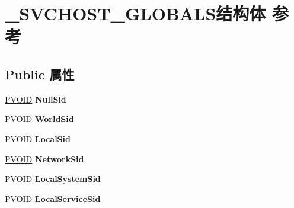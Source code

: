 \hypertarget{struct___s_v_c_h_o_s_t___g_l_o_b_a_l_s}{}\section{\+\_\+\+S\+V\+C\+H\+O\+S\+T\+\_\+\+G\+L\+O\+B\+A\+L\+S结构体 参考}
\label{struct___s_v_c_h_o_s_t___g_l_o_b_a_l_s}
\subsection*{Public 属性}
\begin{DoxyCompactItemize}
\item 
\mbox{\label{struct___s_v_c_h_o_s_t___g_l_o_b_a_l_s_aa0433845f48ce03dc8db1f6a7aff663c}} 
\hyperlink{interfacevoid}{P\+V\+O\+ID} {\bfseries Null\+Sid}
\item 
\mbox{\label{struct___s_v_c_h_o_s_t___g_l_o_b_a_l_s_aa13aeac5885f976b3e39a9c8c1068844}} 
\hyperlink{interfacevoid}{P\+V\+O\+ID} {\bfseries World\+Sid}
\item 
\mbox{\label{struct___s_v_c_h_o_s_t___g_l_o_b_a_l_s_a91bd88e223a397de2829b67fd3712690}} 
\hyperlink{interfacevoid}{P\+V\+O\+ID} {\bfseries Local\+Sid}
\item 
\mbox{\label{struct___s_v_c_h_o_s_t___g_l_o_b_a_l_s_a564578c4a7e471e315ce141f4589a567}} 
\hyperlink{interfacevoid}{P\+V\+O\+ID} {\bfseries Network\+Sid}
\item 
\mbox{\label{struct___s_v_c_h_o_s_t___g_l_o_b_a_l_s_a6bd38664a2cb8d6b0abaabf14c57d56b}} 
\hyperlink{interfacevoid}{P\+V\+O\+ID} {\bfseries Local\+System\+Sid}
\item 
\mbox{\label{struct___s_v_c_h_o_s_t___g_l_o_b_a_l_s_aed55e2fb7560860435822869ecfa3b5b}} 
\hyperlink{interfacevoid}{P\+V\+O\+ID} {\bfseries Local\+Service\+Sid}
\item 
\mbox{\label{struct___s_v_c_h_o_s_t___g_l_o_b_a_l_s_a5dda29c4083829f536902cb0e005ae90}} 

\end{DoxyCompactItemize}
